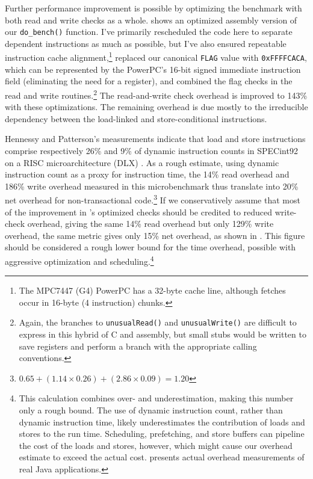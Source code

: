 Further performance improvement is possible by optimizing the
benchmark with both read and write checks as a whole. 
shows an
optimized assembly version of our \texttt{do\_bench()} function.  I've
primarily rescheduled the code here to separate dependent instructions
as much as possible, but I've also ensured repeatable instruction
cache alignment,\footnote{The MPC7447 (G4) PowerPC has a 32-byte cache
  line, although fetches occur in 16-byte (4 instruction) chunks.}
replaced our canonical \texttt{FLAG} value with
\texttt{0xFFFFCACA}, which can be represented by the PowerPC's 16-bit
signed immediate instruction field (eliminating the need for a
register), and combined the flag checks in
the read and write routines.\footnote{Again, the branches to
\texttt{unusualRead()} and 
\texttt{unusualWrite()} are difficult to express in this hybrid of C
and assembly, but small stubs would be written to save registers and
perform a branch with the appropriate calling conventions.}
The read-and-write check overhead is improved to 143\% with these
optimizations.  The remaining overhead is
due mostly to the irreducible dependency between the
load-linked and store-conditional instructions.


Hennessy and Patterson's measurements indicate that load and store
instructions comprise respectively 26\% and 9\% of dynamic instruction
counts in SPECint92 on a RISC microarchitecture (DLX)
\cite[p. 105]{HennessyPa96}.
As a rough estimate, using dynamic instruction count as a proxy for
instruction time,
the 14\% read overhead and 186\% write overhead measured
in this microbenchmark thus translate into 20\% net overhead for
non-transactional code.\footnote{$0.65 + (1.14 \times 0.26) + (2.86
  \times 0.09) = 1.20$} If we conservatively assume that most of the
improvement in 's optimized checks should be credited
to reduced write-check overhead, giving the same 14\% read overhead
but only 129\% write overhead, the same metric gives only 15\% net
overhead, as shown in .  This figure should be
considered a rough lower bound for the time overhead, possible with
aggressive optimization and scheduling.\footnote{This
  calculation combines over- and underestimation, making this number
  only a rough bound.  The use of dynamic instruction count, rather
  than dynamic instruction time, likely underestimates the
  contribution of loads and stores to the run time.
  Scheduling, prefetching, and store buffers can pipeline the cost of
  the loads and stores, however, which might cause our overhead estimate to
  exceed the actual cost.   presents actual
  overhead measurements of real Java applications.}

